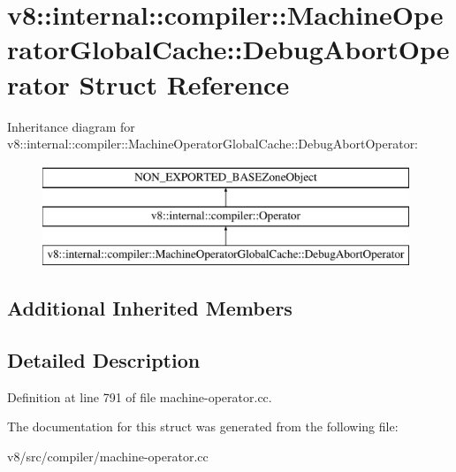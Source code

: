\hypertarget{structv8_1_1internal_1_1compiler_1_1MachineOperatorGlobalCache_1_1DebugAbortOperator}{}\section{v8\+:\+:internal\+:\+:compiler\+:\+:Machine\+Operator\+Global\+Cache\+:\+:Debug\+Abort\+Operator Struct Reference}
\label{structv8_1_1internal_1_1compiler_1_1MachineOperatorGlobalCache_1_1DebugAbortOperator}
Inheritance diagram for v8\+:\+:internal\+:\+:compiler\+:\+:Machine\+Operator\+Global\+Cache\+:\+:Debug\+Abort\+Operator\+:\begin{figure}[H]
\begin{center}
\leavevmode
\includegraphics[height=3.000000cm]{structv8_1_1internal_1_1compiler_1_1MachineOperatorGlobalCache_1_1DebugAbortOperator}
\end{center}
\end{figure}
\subsection*{Additional Inherited Members}


\subsection{Detailed Description}


Definition at line 791 of file machine-\/operator.\+cc.



The documentation for this struct was generated from the following file\+:\begin{DoxyCompactItemize}
\item 
v8/src/compiler/machine-\/operator.\+cc\end{DoxyCompactItemize}
